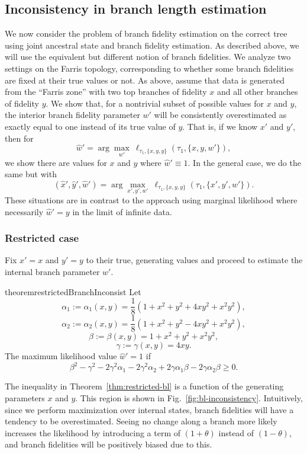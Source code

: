 \documentclass{article}
\begin{document}
\subsection*{Inconsistency in branch length estimation}

We now consider the problem of branch fidelity estimation on the correct tree using joint ancestral state and branch fidelity estimation.
As described above, we will use the equivalent but different notion of branch fidelities.
We analyze two settings on the Farris topology, corresponding to whether some branch fidelities are fixed at their true values or not.
As above, assume that data is generated from the ``Farris zone'' with two top branches of fidelity $x$ and all other branches of fidelity $y$.
We show that, for a nontrivial subset of possible values for $x$ and $y$, the interior branch fidelity parameter $w'$ will be consistently overestimated as exactly equal to one instead of its true value of $y$.
That is, if we know $x'$ and $y'$, then for
$$
\hat{w}' = \arg\max_{w'} \ \ell_{\tau_1,\{x,y,y\}}(\tau_1, \{x,y,w'\}),
$$
we show there are values for $x$ and $y$ where $\hat{w}'\equiv 1$.
In the general case, we do the same but with
$$
(\hat{x}', \hat{y}', \hat{w}') = \arg\max_{x',y',w'} \ \ell_{\tau_1,\{x,y,y\}}(\tau_1, \{x',y',w'\}).
$$
These situations are in contrast to the approach using marginal likelihood where necessarily $\hat{w}'=y$ in the limit of infinite data.

\subsubsection*{Restricted case}

Fix $x'=x$ and $y'=y$ to their true, generating values and proceed to estimate the internal branch parameter $w'$.
\begin{restatable}{theorem}{restrictedBranchInconsist}
\label{thm:restricted-bl}
Let
$$
\alpha_1 := \alpha_1(x, y) = \frac{1}{8} \left(1+x^2+y^2+4xy^2+x^2y^2\right),
$$
$$
\alpha_2 := \alpha_2(x, y) = \frac{1}{8}\left(1+x^2+y^2-4xy^2+x^2y^2\right),
$$
$$
\beta := \beta(x, y) = 1+x^2+y^2+x^2y^2,
$$
$$
\gamma := \gamma(x, y) = 4xy.
$$
The maximum likelihood value $\hat{w}' = 1$ if
$$
\beta^2-\gamma^2-2\gamma^2\alpha_1-2\gamma^2\alpha_2+2\gamma\alpha_1\beta-2\gamma\alpha_2\beta \ge 0.
$$
\end{restatable}
The inequality in Theorem~\ref{thm:restricted-bl} is a function of the generating parameters $x$ and $y$.
This region is shown in Fig.~\ref{fig:bl-inconsistency}.
Intuitively, since we perform maximization over internal states, branch fidelities will have a tendency to be overestimated.
Seeing no change along a branch more likely increases the likelihood by introducing a term of $(1+\theta)$ instead of $(1-\theta)$, and branch fidelities will be positively biased due to this.
\end{document}
